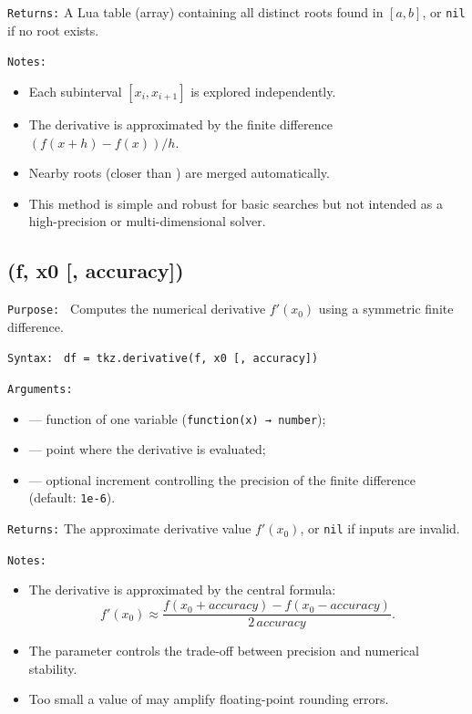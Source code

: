 \medskip
\texttt{Returns:}
A Lua table (array) containing all distinct roots found in \([a,b]\),
or \texttt{nil} if no root exists.


\medskip
\texttt{Notes:}
\begin{itemize}
  \item Each subinterval \([x_i, x_{i+1}]\) is explored independently.
  \item The derivative is approximated by the finite difference
        \((f(x+h)-f(x))/h\).
  \item Nearby roots (closer than ) are merged automatically.
  \item This method is simple and robust for basic searches but not intended
        as a high-precision or multi-dimensional solver.
\end{itemize}


\subsection{(f, x0 [, accuracy])}
\label{sub:derivative}

\texttt{Purpose: }
Computes the numerical derivative \( f'(x_0) \) using a symmetric finite difference.

\medskip
\texttt{Syntax: }
\verb|df = tkz.derivative(f, x0 [, accuracy])|

\medskip
\texttt{Arguments:}
\begin{itemize}
  \item {} — function of one variable (\texttt{function(x) → number});
  \item {} — point where the derivative is evaluated;
  \item {} — optional increment controlling the precision of the finite difference (default: \texttt{1e-6}).
\end{itemize}

\medskip
\texttt{Returns:}
The approximate derivative value \( f'(x_0) \), or \texttt{nil} if inputs are invalid.


\medskip
\texttt{Notes:}
\begin{itemize}
  \item The derivative is approximated by the central formula:
  \[
     f'(x_0) \approx \frac{f(x_0 + accuracy) - f(x_0 - accuracy)}{2\,accuracy}.
  \]
  \item The parameter  controls the trade-off between precision and numerical stability.
  \item Too small a value of  may amplify floating-point rounding errors.
\end{itemize}

